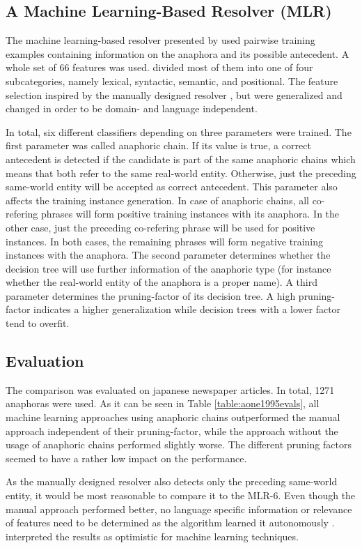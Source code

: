 \subsection{A Machine Learning-Based Resolver (MLR)}
The machine learning-based resolver presented by \cite{aone1995evaluating} used pairwise training examples containing information on the anaphora and its possible antecedent. A whole set of 66 features was used. \cite{aone1995evaluating} divided most of them into one of four subcategories, namely lexical, syntactic, semantic, and positional. The feature selection inspired by the manually designed resolver \citep{aone1993language}, but were generalized and changed in order to be domain- and language independent.

In total, six different classifiers depending on three parameters were trained. The first parameter was called anaphoric chain. If its value is true, a correct antecedent is detected if the candidate is part of the same anaphoric chains which means that both refer to the same real-world entity. Otherwise, just the preceding same-world entity will be accepted as correct antecedent. This parameter also affects the training instance generation. In case of anaphoric chains, all co-refering phrases will form positive training instances with its anaphora. In the other case, just the preceding co-refering phrase will be used for positive instances. In both cases, the remaining phrases will form negative training instances with the anaphora. The second parameter determines whether the decision tree will use further information of the anaphoric type (for instance whether the real-world entity of the anaphora is a proper name). A third parameter determines the pruning-factor of its decision tree. A high pruning-factor indicates a higher generalization while decision trees with a lower factor tend to overfit. 

\subsection{Evaluation}
The comparison was evaluated on japanese newspaper articles. In total, 1271 anaphoras were used. As it can be seen in Table \ref{table:aone1995evals}, all machine learning approaches using anaphoric chains outperformed the manual approach independent of their pruning-factor, while the approach without the usage of anaphoric chains performed slightly worse. The different pruning factors seemed to have a rather low impact on the performance.

As the manually designed resolver also detects only the preceding same-world entity, it would be most reasonable to compare it to the MLR-6. Even though the manual approach performed better, no language specific information or relevance of features need to be determined as the algorithm learned it autonomously \citep{aone1995evaluating}. \cite{aone1995evaluating} interpreted the results as optimistic for machine learning techniques.

